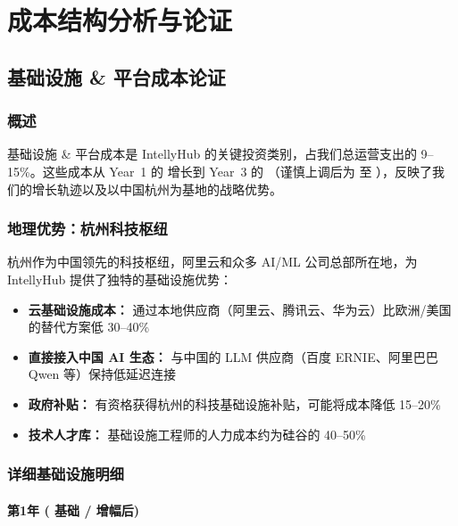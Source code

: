 \documentclass[11pt, a4paper, oneside]{article}
\begin{document}


\restoregeometry
\endgroup

\section{成本结构分析与论证}
\label{sec:cost-analysis}

\subsection{基础设施 \& 平台成本论证}

\subsubsection{概述}
基础设施 \& 平台成本是 IntellyHub 的关键投资类别，占我们总运营支出的 9--15\%。这些成本从 Year~1 的  增长到 Year~3 的 （谨慎上调后为  至 ），反映了我们的增长轨迹以及以中国杭州为基地的战略优势。

\subsubsection{地理优势：杭州科技枢纽}
杭州作为中国领先的科技枢纽，阿里云和众多 AI/ML 公司总部所在地，为 IntellyHub 提供了独特的基础设施优势：

\begin{itemize}
    \item \textbf{云基础设施成本：} 通过本地供应商（阿里云、腾讯云、华为云）比欧洲/美国的替代方案低 30--40\%
    \item \textbf{直接接入中国 AI 生态：} 与中国的 LLM 供应商（百度 ERNIE、阿里巴巴 Qwen 等）保持低延迟连接
    \item \textbf{政府补贴：} 有资格获得杭州的科技基础设施补贴，可能将成本降低 15--20\%
    \item \textbf{技术人才库：} 基础设施工程师的人力成本约为硅谷的 40--50\%
\end{itemize}

\subsubsection{详细基础设施明细}

\paragraph{第1年 ( 基础 /  增幅后)}
\end{document}

